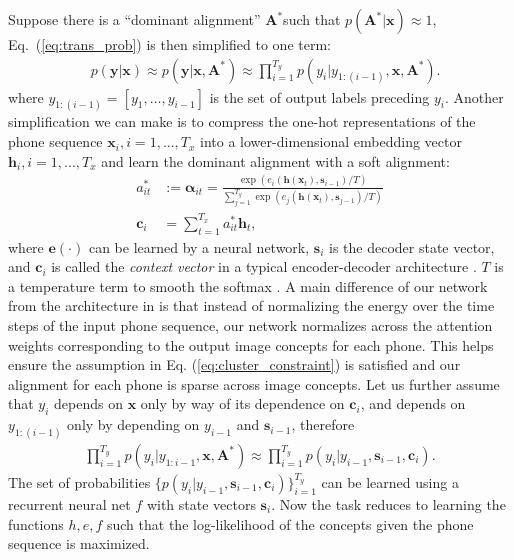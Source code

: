 \documentclass[a4paper]{article}
\begin{document}
Suppose there is a ``dominant alignment'' $\mathbf{A}^*$such that $p(\mathbf{A}^*|\mathbf{x})\approx 1$, Eq.~(\ref{eq:trans_prob}) is then simplified to one term:
\begin{align}\label{eq:trans_prob_dominant}
     &p(\mathbf{y}|\mathbf{x})
     \approx p(\mathbf{y}|\mathbf{x}, \mathbf{A}^*)  \approx
     \prod_{i=1}^{T_y} p(y_i|y_{1:(i-1)},\mathbf{x}, \mathbf{A}^*).
\end{align}
where $y_{1:(i-1)}=[y_1,\ldots,y_{i-1}]$ is the set of output labels preceding $y_i$.
Another simplification we can make is to compress the one-hot representations of the phone sequence $\mathbf{x}_i, i=1,...,T_x$ into a lower-dimensional embedding vector $\mathbf{h}_i, i=1,...,T_x$ and learn the dominant alignment with a soft alignment:
\begin{align}\label{eq:attention}
    a^*_{it} &:= \mathbf\alpha_{it} =  \frac{\exp(e_i(\mathbf h(\mathbf x_t), \mathbf s_{i-1})/T)}{\sum_{j=1}^{T_y} \exp(e_j(\mathbf h(\mathbf{x}_t), \mathbf s_{j-1})/T)}\\
    \mathbf{c}_i &= \sum_{t=1}^{T_x} a^*_{it} \mathbf{h}_{t},
\end{align}
where $\mathbf e(\cdot)$ can be learned by a neural network,
$\mathbf{s}_i$ is the decoder state vector, and 
$\mathbf{c}_i$ is called the \textit{context vector} in a typical encoder-decoder architecture \cite{Bahdanau14}.
$T$ is a temperature term to smooth the softmax \cite{Duong16}.
A main difference of
our network from the architecture in \cite{Bahdanau14} is that instead of normalizing the energy over the time steps of the input phone sequence, our network normalizes across the attention weights corresponding to the output image concepts for each phone. This helps ensure the assumption in Eq. (\ref{eq:cluster_constraint}) is satisfied and our alignment for each phone is sparse across image concepts.
Let us further assume that $y_i$ depends on $\mathbf{x}$ only by way of its dependence on $\mathbf{c}_i$,
and depends on $y_{1:(i-1)}$ only by depending on $y_{i-1}$ and $\mathbf{s}_{i-1}$, therefore
\begin{align}
    \prod_{i=1}^{T_y} p(y_i|y_{1:i-1}, \mathbf{x}, \mathbf{A}^*) \approx
    \prod_{i=1}^{T_y} p(y_i|y_{i-1}, \mathbf{s}_{i-1}, \mathbf{c}_i).
\end{align}
The set of probabilities $\{p(y_i|y_{i-1}, \mathbf{s}_{i-1}, \mathbf{c}_i)\}_{i=1}^{T_y}$ can be learned using a recurrent neural net $f$ with state vectors $\mathbf{s}_i$. Now the task reduces to learning the functions $h, e, f$ such that the log-likelihood of the concepts given the phone sequence is maximized.
\end{document}
